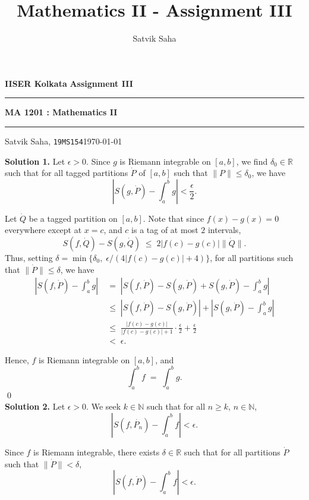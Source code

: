 \documentclass[10pt]{article}
\title{Mathematics II - Assignment III}
\author{Satvik Saha}
\date{}
\begin{document}
        \par\textbf{IISER Kolkata} \hfill \textbf{Assignment III}
        \vspace{3pt}
        \hrule
        \vspace{3pt}
        \begin{center}
                \LARGE{\textbf{MA 1201 : Mathematics II}}
        \end{center}
        \vspace{3pt}
        \hrule
        \vspace{3pt}
        Satvik Saha, \texttt{19MS154}\hfill\today
        \vspace{20pt}

        \textbf{Solution 1.}
        Let $\epsilon > 0$. Since $g$ is Riemann integrable on $[a, b]$, we find $\delta_0 \in \mathbb{R}$ such that for all tagged partitions $\dot{P}$ of 
        $[a, b]$ such that $ \| P  \| \le \delta_0$, we have
        \[| S(g, \dot{P}) - \int_a^b g | < \frac{\epsilon}2.\]
        
        Let $\dot{Q}$ be a tagged partition on $[a, b]$. Note that since $f(x) - g(x) = 0$ everywhere except at $x = c$,
        and $c$ is a tag of at most $2$ intervals,
        \[S(f, \dot{Q}) - S(g, \dot{Q}) \;\le\; 2|f(c) - g(c)|\|\dot{Q}\|.\]
        Thus, setting $\delta = \min \{ \delta_0, \;\epsilon / (4|f(c) - g(c)| + 4)\} $, for all partitions such that $\|\dot{P}\| \le \delta$, we have
        \begin{align*}
        |S(f, \dot{P}) - \int_a^b g| 
        \;&=\;   |S(f, \dot{P}) - S(g, \dot{P}) + S(g, \dot{P}) - \int_a^b g| \\
        \;&\le\; |S(f, \dot{P}) - S(g, \dot{P})| + |S(g, \dot{P}) - \int_a^b g| \\
        \;&\le\; \frac{|f(c) - g(c)|}{|f(c) - g(c)| + 1}\cdot\frac{\epsilon}2 + \frac{\epsilon}2 \\
        \;&<\; \epsilon.
        \end{align*}

        Hence, $f$ is Riemann integrable on $[a, b]$, and
        \[\int_a^b f \;=\; \int_a^b g.\] \qed\\

        \textbf{Solution 2.}
        Let $\epsilon > 0$. We seek $k \in \mathbb{N}$ such that for all $n \ge k$, $n \in \mathbb{N}$,
        \[ |S(f, \dot{P_n}) - \int_a^b f| < \epsilon.\]

        Since $f$ is Riemann integrable, there exists $\delta \in \mathbb{R}$ such that for all partitions $\dot{P}$ such that $\|\dot{P}\| < \delta$,
        \[|S(f, \dot{P}) - \int_a^b f| < \epsilon.\]
\end{document}
